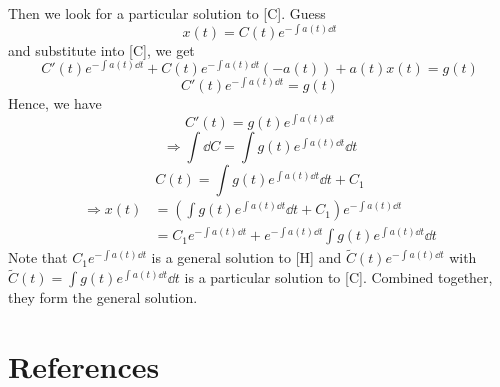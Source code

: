 \documentclass[twoside]{article}
\begin{document}
Then we look for a particular solution to [C]. Guess \begin{equation}
    x(t) = C(t)e^{-\int a(t) \dd t}
\end{equation}
and substitute into [C], we get
\begin{equation}
    C'(t)e^{-\int a(t) \dd t} + C(t)e^{-\int a(t) \dd t}(-a(t)) + a(t)x(t) = g(t)
\end{equation}
\begin{equation}
    C'(t)e^{-\int a(t) \dd t} = g(t)
\end{equation}
Hence, we have
\begin{equation}
    C'(t) = g(t)e^{\int a(t) \dd t}
\end{equation}
\begin{equation}
    \Longrightarrow \int \dd C = \int g(t)e^{\int a(t) \dd t} \dd t
\end{equation}
\begin{equation}
    C(t) = \int g(t)e^{\int a(t) \dd t} \dd t + C_1
\end{equation}
\begin{equation}
\begin{aligned}
    \Longrightarrow x(t) &= \left (\int g(t)e^{\int a(t) \dd t} \dd t + C_1 \right ) e^{-\int a(t) \dd t}\\
    &= C_1 e^{-\int a(t) \dd t} + e^{-\int a(t) \dd t} \int g(t)e^{\int a(t) \dd t} \dd t
\end{aligned}
\end{equation}
Note that $C_1 e^{-\int a(t) \dd t}$ is a general solution to [H] and $\tilde{C}(t) e^{-\int a(t) \dd t}$ with $\tilde{C}(t) = \int g(t)e^{\int a(t) \dd t} \dd t$ is a particular solution to [C]. Combined together, they form the general solution.
     

















\clearpage
\section*{References}

\end{document}
